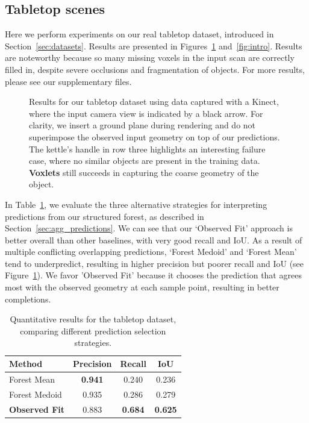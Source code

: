 \documentclass[10pt,twocolumn,letterpaper]{article}
\begin{document}
\subsection{Tabletop scenes}
\label{sec:exp_tt}
Here we perform experiments on our real tabletop dataset, introduced in Section~\ref{sec:datasets}.
Results are presented in Figures~\ref{fig:tabletop_res} and~\ref{fig:intro}. Results are noteworthy because so many missing voxels in the input scan are correctly filled in, despite severe occlusions and fragmentation of objects. For more results, please see our supplementary files.

\begin{figure}[!t]
    
    \vspace{5pt}
     \caption{
     Results for our tabletop dataset using data captured with a Kinect, where the input camera view is indicated by a black arrow.
     For clarity, we insert a ground plane during rendering and do not superimpose the observed input geometry on top of our predictions.
     The kettle's handle in row three highlights an interesting failure case, where no  similar objects are present in the training data.
     {\bf Voxlets} still succeeds in capturing the coarse geometry of the object.
     }
     \label{fig:tabletop_res}
\end{figure}

In Table~\ref{tab:tabletop_tab}, we evaluate the three alternative strategies for interpreting predictions from our structured forest, as described in Section~\ref{sec:agg_predictions}.
We can see that our `Observed Fit' approach is better overall than other baselines, with very good recall and IoU.
As a result of multiple conflicting overlapping predictions, `Forest Medoid' and `Forest Mean' tend to underpredict, resulting in higher precision but poorer recall and IoU (see Figure~\ref{fig:tabletop_res}).
We favor 'Observed Fit' because it chooses the prediction that agrees most with the observed geometry at each sample point, resulting in better completions.

\begin{table}
  \centering
  \begin{tabular}{|p{2.5cm}|c|c|c|}
  \hline
  \textbf{Method}  &   \textbf{Precision} & \textbf{Recall} & \textbf{IoU}\\
  \hline
    Forest Mean  & {\bf 0.941} &  0.240 & 0.236 \\
    Forest Medoid & 0.935 &  0.286 &     0.279 \\
    {\bf Observed Fit}  & { 0.883} & {\bf 0.684} & {\bf 0.625} \\
  \hline
  \end{tabular}
  \vspace{5pt}
  \caption{Quantitative results for the tabletop dataset,  comparing different prediction selection strategies.}
    \label{tab:tabletop_tab}
    \vspace{-5pt}
\end{table}
\end{document}
